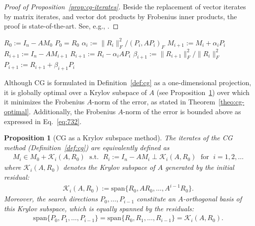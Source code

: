 \documentclass[numbers,webpdf,imanum]{ima-authoring-template}%
\theoremstyle{thmstyletwo}%
\newtheorem{proposition}[theorem]{Proposition}%
\numberwithin{equation}{section}
\begin{document}
\begin{proof}[Proof of Proposition~\ref{prop:cg-iterates}]
Beside the replacement of vector iterates by matrix iterates, and vector dot products by Frobenius inner products, the proof is state-of-the-art.
See, e.g., \cite{ciaramella_iterative_2022}.
\end{proof}

\begin{algorithm}[ht]
\caption{CG($A$, $M_0$, $\texttt{ExplicitResidualUpdate}$)}
\label{algo:cg}
\begin{algorithmic}[1]
\State $R_0:=I_n-AM_0$
\State $P_0=R_0$
\State $\alpha_i:=\|R_i\|_F^2/(P_i,AP_i)_F$
\State $M_{i+1}:=M_i+\alpha_i P_i$
\State $R_{i+1}:=I_n-AM_{i+1}$
\Else
\State $R_{i+1}:=R_i-\alpha_iAP_i$
\EndIf
\State $\beta_{i+1}:=\|R_{i+1}\|_F^2/\|R_i\|_F^2$
\State $P_{i+1}:=R_{i+1}+\beta_{i+1} P_i$
\EndFor
\end{algorithmic}
\end{algorithm}

Although CG is formulated in Definition~\ref{def:cg} as a one-dimensional projection, it is globally optimal over a Krylov subspace of $A$ (see Proposition~\ref{prop:cg-krylov}) over which it minimizes the Frobenius $A$-norm of the error, as stated in Theorem~\ref{theo:cg-optimal}.
Additionally, the Frobenius $A$-norm of the error is bounded above as expressed in Eq.~\eqref{eq:732}.

\begin{proposition}[CG as a Krylov subspace method]\label{prop:cg-krylov}
The iterates of the CG method (Definition~\ref{def:cg}) are equivalently defined as
\begin{align}
M_i\in M_0+\mathcal{K}_i(A,R_0)
\;\text{ s.t. }\;
R_i:=I_n-AM_i\perp \mathcal{K}_i(A,R_0)
\;\text{ for }\;
i=1,2,\dots
\end{align}
where $\mathcal{K}_i(A,R_0)$ denotes the Krylov subspace of $A$ generated by the initial residual:
\begin{align}
\mathcal{K}_i(A,R_0):=\text{span}\{R_0,AR_0,\dots,A^{i-1}R_0\}.
\end{align}
Moreover, the search directions $P_0,\dots,P_{i-1}$ constitute an $A$-orthogonal basis of this Krylov subspace, which is equally spanned by the residuals:
\begin{align}
\text{span}\{P_0,P_1,\dots,P_{i-1}\}
=
\text{span}\{R_0,R_1,\dots,R_{i-1}\}
=
\mathcal{K}_i(A,R_0).
\end{align}
\end{proposition}
\end{document}
